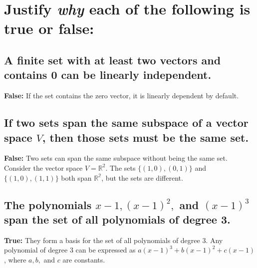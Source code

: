 \documentclass[
  letterpaper,
  DIV=11,
  numbers=noendperiod]{scrartcl}
\begin{document}
\newpage{}

\section{\texorpdfstring{Justify \emph{why} each of the following is
true or
false:}{Justify why each of the following is true or false:}}\label{justify-why-each-of-the-following-is-true-or-false}

\subsection{\texorpdfstring{A finite set with at least two vectors and
contains \textbf{0} can be linearly
independent.}{A finite set with at least two vectors and contains 0 can be linearly independent.}}\label{a-finite-set-with-at-least-two-vectors-and-contains-0-can-be-linearly-independent.}

\textbf{False:} If the set contains the zero vector, it is linearly
dependent by default.

\subsection{\texorpdfstring{If two sets span the same subspace of a
vector space \(V\), then those sets must be the same
set.}{If two sets span the same subspace of a vector space V, then those sets must be the same set.}}\label{if-two-sets-span-the-same-subspace-of-a-vector-space-v-then-those-sets-must-be-the-same-set.}

\textbf{False:} Two sets can span the same subspace without being the
same set. Consider the vector space \(V = \mathbb{R}^2\). The sets
\(\{(1, 0), (0, 1)\}\) and \(\{(1,0), (1,1)\}\) both span
\(\mathbb{R^2}\), but the sets are different.

\subsection{\texorpdfstring{The polynomials \(x-1, (x-1)^2,\) and
\((x-1)^3\) span the set of all polynomials of degree
3.}{The polynomials x-1, (x-1)\^{}2, and (x-1)\^{}3 span the set of all polynomials of degree 3.}}\label{the-polynomials-x-1-x-12-and-x-13-span-the-set-of-all-polynomials-of-degree-3.}

\textbf{True:} They form a basis for the set of all polynomials of
degree 3. Any polynomial of degree 3 can be expressed as
\(a(x-1)^3 + b(x-1)^2 + c(x-1)\), where \(a, b,\) and \(c\) are
constants.
\end{document}
